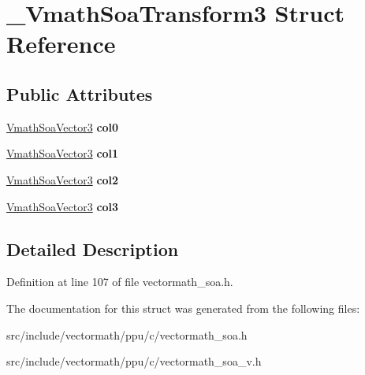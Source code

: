 \hypertarget{struct__VmathSoaTransform3}{\section{\-\_\-\-Vmath\-Soa\-Transform3 Struct Reference}
\label{struct__VmathSoaTransform3}
}
\subsection*{Public Attributes}
\begin{DoxyCompactItemize}
\item 
\hypertarget{struct__VmathSoaTransform3_a316194eccb33173ae415bf42a1e8cf5a}{\hyperlink{struct__VmathSoaVector3}{Vmath\-Soa\-Vector3} {\bfseries col0}}\label{struct__VmathSoaTransform3_a316194eccb33173ae415bf42a1e8cf5a}

\item 
\hypertarget{struct__VmathSoaTransform3_aa2069f9094e117799a3f6ebf197ec965}{\hyperlink{struct__VmathSoaVector3}{Vmath\-Soa\-Vector3} {\bfseries col1}}\label{struct__VmathSoaTransform3_aa2069f9094e117799a3f6ebf197ec965}

\item 
\hypertarget{struct__VmathSoaTransform3_a403765af832e882ab3053ecf6f7477c7}{\hyperlink{struct__VmathSoaVector3}{Vmath\-Soa\-Vector3} {\bfseries col2}}\label{struct__VmathSoaTransform3_a403765af832e882ab3053ecf6f7477c7}

\item 
\hypertarget{struct__VmathSoaTransform3_a8a0ea5310d50210c41d1addb55456f18}{\hyperlink{struct__VmathSoaVector3}{Vmath\-Soa\-Vector3} {\bfseries col3}}\label{struct__VmathSoaTransform3_a8a0ea5310d50210c41d1addb55456f18}

\end{DoxyCompactItemize}


\subsection{Detailed Description}


Definition at line 107 of file vectormath\-\_\-soa.\-h.



The documentation for this struct was generated from the following files\-:\begin{DoxyCompactItemize}
\item 
src/include/vectormath/ppu/c/vectormath\-\_\-soa.\-h\item 
src/include/vectormath/ppu/c/vectormath\-\_\-soa\-\_\-v.\-h\end{DoxyCompactItemize}
